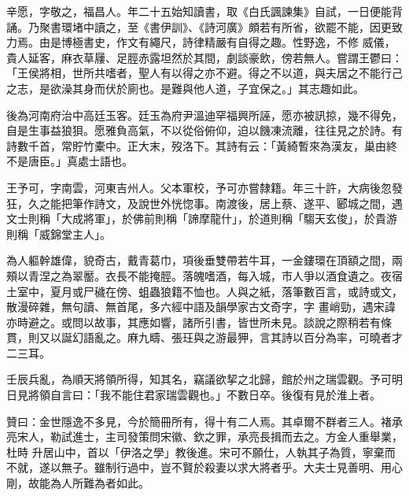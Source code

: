 \begin{pinyinscope}
 辛愿，字敬之，福昌人。年二十五始知讀書，取《白氏諷諫集》自試，一日便能背誦。乃聚書環堵中讀之，至《書伊訓》、《詩河廣》頗若有所省，欲罷不能，因更致力焉。由是博極書史，作文有繩尺，詩律精嚴有自得之趣。性野逸，不修
 威儀，貴人延客，麻衣草屨、足脛赤露坦然於其間，劇談豪飲，傍若無人。嘗謂王鬱曰：「王侯將相，世所共嗜者，聖人有以得之亦不避。得之不以道，與夫居之不能行己之志，是欲澡其身而伏於廁也。是難與他人道，子宜保之。」其志趣如此。



 後為河南府治中高廷玉客。廷玉為府尹溫迪罕福興所誣，愿亦被訊掠，幾不得免，自是生事益狼狽。愿雅負高氣，不以從俗俯仰，迫以饑凍流離，往往見之於詩。有詩數千首，常貯竹橐中。正大末，歿洛下。其詩有云：「黃綺暫來為漢友，巢由終不是唐臣。」真處士語也。



 王予可，字南雲，河東吉州人。父本軍校，予可亦嘗隸籍。年三十許，大病後忽發狂，久之能把筆作詩文，及說世外恍惚事。南渡後，居上蔡、遂平、郾城之間，遇文士則稱「大成將軍」，於佛前則稱「諦摩龍什」，於道則稱「騶天玄俊」，於貴游則稱「威錦堂主人」。



 為人軀幹雄偉，貌奇古，戴青葛巾，項後垂雙帶若牛耳，一金鏤環在頂額之間，兩頰以青涅之為翠靨。衣長不能掩脛。落魄嗜酒，每入城，市人爭以酒食遺之。夜宿土室中，夏月或尸穢在傍、蛆蟲狼籍不恤也。人與之紙，落筆數百言，或詩或文，散漫碎雜，無句讀、無首尾，多六經中語及韻學家古文奇字，字
 畫峭勁，遇宋諱亦時避之。或問以故事，其應如響，諸所引書，皆世所未見。談說之際稍若有條貫，則又以誕幻語亂之。麻九疇、張玨與之游最狎，言其詩以百分為率，可曉者才二三耳。



 壬辰兵亂，為順天將領所得，知其名，竊議欲挈之北歸，館於州之瑞雲觀。予可明日見將領自言曰：「我不能住君家瑞雲觀也。」不數日卒。後復有見於淮上者。



 贊曰：金世隱逸不多見，今於簡冊所有，得十有二人焉。其卓爾不群者三人。褚承亮宋人，勒試進士，主司發策問宋徽、欽之罪，承亮長揖而去之。方金人重舉業，杜時
 升居山中，首以「伊洛之學」教後進。宋可不願仕，人執其子為質，寧棄而不就，遂以無子。雖制行過中，豈不賢於殺妻以求大將者乎。大夫士見善明、用心剛，故能為人所難為者如此。



\end{pinyinscope}